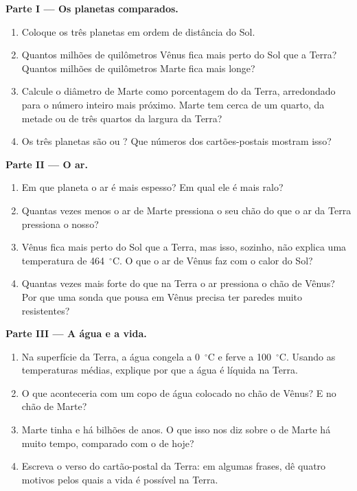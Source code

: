 \begin{problem}
\medskip
\noindent\textbf{Parte I --- Os planetas comparados.}
\begin{enumerate}
  \item Coloque os três planetas em ordem de distância do Sol.
  \item Quantos milhões de quilômetros Vênus fica mais perto do Sol que a
        Terra? Quantos milhões de quilômetros Marte fica mais longe?
  \item Calcule o diâmetro de Marte como porcentagem do da Terra,
        arredondado para o número inteiro mais próximo. Marte tem cerca de
        um quarto, da metade ou de três quartos da largura da Terra?
  \item Os três planetas são  ou ? Que
        números dos cartões-postais mostram isso?
\end{enumerate}

\medskip
\noindent\textbf{Parte II --- O ar.}
\begin{enumerate}[resume]
  \item Em que planeta o ar é mais espesso? Em qual ele é mais ralo?
  \item Quantas vezes menos o ar de Marte pressiona o seu chão do que o ar
        da Terra pressiona o nosso?
  \item Vênus fica mais perto do Sol que a Terra, mas isso, sozinho, não
        explica uma temperatura de 464~$^\circ$C. O que o ar de Vênus faz
        com o calor do Sol?
  \item Quantas vezes mais forte do que na Terra o ar pressiona o chão de
        Vênus? Por que uma sonda que pousa em Vênus precisa ter paredes muito resistentes?
\end{enumerate}

\medskip
\noindent\textbf{Parte III --- A água e a vida.}
\begin{enumerate}[resume]
  \item Na superfície da Terra, a água congela a 0~$^\circ$C e ferve a
        100~$^\circ$C. Usando as temperaturas médias, explique por que a
        água é líquida na Terra.
  \item O que aconteceria com um copo de água colocado no chão de Vênus?
        E no chão de Marte?
  \item Marte tinha  e  há bilhões de anos. O que isso nos diz
        sobre o  de Marte há muito tempo, comparado com o de hoje?
  \item Escreva o verso do cartão-postal da Terra: em algumas frases, dê
        quatro motivos pelos quais a vida é possível na Terra.
\end{enumerate}
\end{problem}
